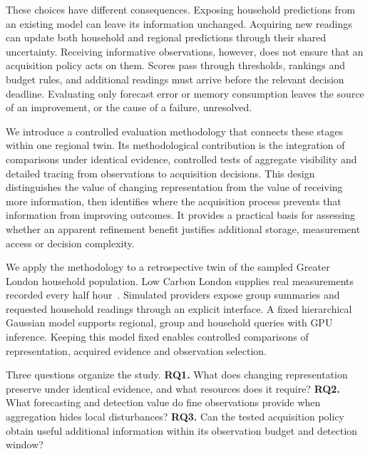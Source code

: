 \documentclass[conference]{IEEEtran}
\begin{document}
These choices have different consequences. Exposing household predictions from an existing model can leave its information unchanged. Acquiring new readings can update both household and regional predictions through their shared uncertainty. Receiving informative observations, however, does not ensure that an acquisition policy acts on them. Scores pass through thresholds, rankings and budget rules, and additional readings must arrive before the relevant decision deadline. Evaluating only forecast error or memory consumption leaves the source of an improvement, or the cause of a failure, unresolved.

We introduce a controlled evaluation methodology that connects these stages within one regional twin. Its methodological contribution is the integration of comparisons under identical evidence, controlled tests of aggregate visibility and detailed tracing from observations to acquisition decisions. This design distinguishes the value of changing representation from the value of receiving more information, then identifies where the acquisition process prevents that information from improving outcomes. It provides a practical basis for assessing whether an apparent refinement benefit justifies additional storage, measurement access or decision complexity.

We apply the methodology to a retrospective twin of the sampled Greater London household population. Low Carbon London supplies real measurements recorded every half hour~\cite{london}. Simulated providers expose group summaries and requested household readings through an explicit interface. A fixed hierarchical Gaussian model supports regional, group and household queries with GPU inference. Keeping this model fixed enables controlled comparisons of representation, acquired evidence and observation selection.

Three questions organize the study. \textbf{RQ1.} What does changing representation preserve under identical evidence, and what resources does it require? \textbf{RQ2.} What forecasting and detection value do fine observations provide when aggregation hides local disturbances? \textbf{RQ3.} Can the tested acquisition policy obtain useful additional information within its observation budget and detection window?
\end{document}
